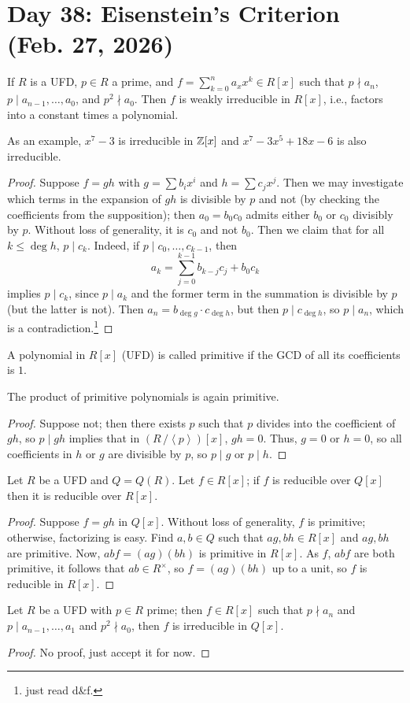 \section{Day 38: Eisenstein's Criterion (Feb. 27, 2026)}
\begin{theorem}
    If $R$ is a UFD, $p \in R$ a prime, and $f = \sum_{k=0}^n a_x x^k \in R[x]$ such that $p \nmid a_n$, $p \mid a_{n-1}, \dots, a_0$, and $p^2 \nmid a_0$. Then $f$ is weakly irreducible in $R[x]$, i.e., factors into a constant times a polynomial.
\end{theorem}
As an example, $x^7 - 3$ is irreducible in $\mathbb Z[x]$ and $x^7 - 3x^5 + 18x - 6$ is also irreducible.
\begin{proof}
    Suppose $f = gh$ with $g = \sum b_i x^i$ and $h = \sum c_j x^j$. Then we may investigate which terms in the expansion of $gh$ is divisible by $p$ and not (by checking the coefficients from the supposition); then $a_0 = b_0 c_0$ admits either $b_0$ or $c_0$ divisibly by $p$. Without loss of generality, it is $c_0$ and not $b_0$. Then we claim that for all $k \leq \deg h$, $p \mid c_k$. Indeed, if $p \mid c_0, \dots, c_{k-1}$, then
    \[ a_k = \sum_{j=0}^{k-1} b_{k-j} c_j + b_0 c_k \]
    implies $p \mid c_k$, since $p \mid a_k$ and the former term in the summation is divisible by $p$ (but the latter is not). Then $a_n = b_{\deg g} \cdot c_{\deg h}$, but then $p \mid c_{\deg h}$, so $p \mid a_n$, which is a contradiction.\footnote{just read d\&f.}
\end{proof}
\begin{definition}
    A polynomial in $R[x]$ (UFD) is called primitive if the GCD of all its coefficients is $1$.
\end{definition}
\begin{lemma}
    The product of primitive polynomials is again primitive.
\end{lemma}
\begin{proof}
    Suppose not; then there exists $p$ such that $p$ divides into the coefficient of $gh$, so $p \mid gh$ implies that in $(R\,/\!\left<p\right>)[x]$, $gh = 0$. Thus, $g = 0$ or $h = 0$, so all coefficients in $h$ or $g$ are divisible by $p$, so $p \mid g$ or $p \mid h$.
\end{proof}
\begin{theorem}
    Let $R$ be a UFD and $Q = Q(R)$. Let $f \in R[x]$; if $f$ is reducible over $Q[x]$ then it is reducible over $R[x]$.
\end{theorem}
\begin{proof}
    Suppose $f = gh$ in $Q[x]$. Without loss of generality, $f$ is primitive; otherwise, factorizing is easy. Find $a, b \in Q$ such that $ag, bh \in R[x]$ and $ag, bh$ are primitive. Now, $abf = (ag)(bh)$ is primitive in $R[x]$. As $f$, $abf$ are both primitive, it follows that $ab \in R^\times$, so $f = (ag)(bh)$ up to a unit, so $f$ is reducible in $R[x]$.
\end{proof}
\begin{theorem}
    Let $R$ be a UFD with $p \in R$ prime; then $f \in R[x]$ such that $p \nmid a_n$ and $p \mid a_{n-1}, \dots, a_1$ and $p^2 \nmid a_0$, then $f$ is irreducible in $Q[x]$.
\end{theorem}
\begin{proof}
    No proof, just accept it for now.
\end{proof}